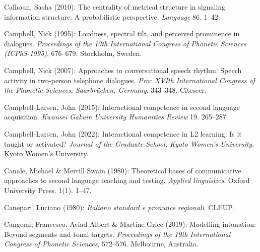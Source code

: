 \begin{styleBibliography}
Calhoun, Sasha (2010): The centrality of metrical structure in signaling information structure: A probabilistic perspective. \textit{Language} 86. 1–42.
\end{styleBibliography}

\begin{styleBibliography}
Campbell, Nick (1995): Loudness, spectral tilt, and perceived prominence in dialogues. \textit{Proceedings of the 13th International Congress of Phonetic Sciences (ICPhS-1995)}, 676–679. Stockholm, Sweden.
\end{styleBibliography}

\begin{styleBibliography}
Campbell, Nick (2007): Approaches to conversational speech rhythm: Speech activity in two-person telephone dialogues. \textit{Proc XVIth International Congress of the Phonetic Sciences, Saarbrücken, Germany}, 343–348. Citeseer.
\end{styleBibliography}

\begin{styleBibliography}
Campbell-Larsen, John (2015): Interactional competence in second language acquisition. \textit{Kwansei Gakuin University Humanities Review} 19. 265–287.
\end{styleBibliography}

\begin{styleBibliography}
Campbell-Larsen, John (2022): Interactional competence in L2 learning: Is it taught or activated? \textit{Journal of the Graduate School, Kyoto Women’s University}. Kyoto Women’s University.
\end{styleBibliography}

\begin{styleBibliography}
Canale, Michael \& Merrill Swain (1980): Theoretical bases of communicative approaches to second language teaching and testing. \textit{Applied linguistics}. Oxford University Press. 1(1). 1–47.
\end{styleBibliography}

\begin{styleBibliography}
Canepari, Luciano (1980): \textit{Italiano standard e pronunce regionali}. CLEUP.
\end{styleBibliography}

\begin{styleBibliography}
Cangemi, Francesco, Aviad Albert \& Martine Grice (2019): Modelling intonation: Beyond segments and tonal targets. \textit{Proceedings of the 19th International Congress of Phonetic Sciences}, 572–576. Melbourne, Australia.
\end{styleBibliography}

